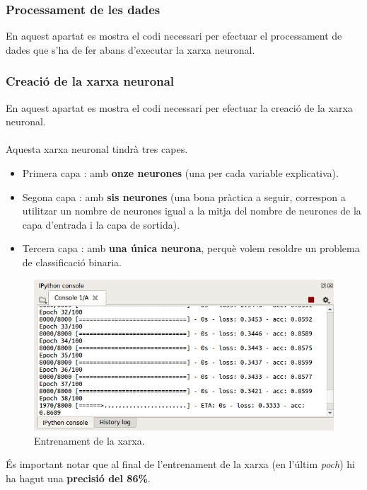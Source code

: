 \documentclass[12pt]{article}
\begin{document}
\subsubsection{Processament de les dades}
En aquest apartat es mostra el codi necessari per efectuar el processament de dades que s'ha de fer abans d'executar la xarxa neuronal.


\subsubsection{Creació de la xarxa neuronal}
En aquest apartat es mostra el codi necessari per efectuar la creació de la xarxa neuronal.
\\\\Aquesta xarxa neuronal tindrà tres capes.
\begin{itemize}
	\item Primera capa : amb \textbf{onze neurones} (una per cada variable explicativa).
	\item Segona capa : amb \textbf{sis neurones} (una bona pràctica a seguir, correspon a utilitzar un nombre de neurones igual a la mitja del nombre de neurones de la capa d'entrada i la capa de sortida).
	\item Tercera capa : amb \textbf{una única neurona}, perquè volem resoldre un problema de classificació binaria.
\end{itemize}

\begin{figure}[h!]
	\centering
	\includegraphics[scale=0.4]{imatges/python/entrenament.png}
	\caption{Entrenament de la xarxa.}
\end{figure}
És important notar que al final de l'entrenament de la xarxa (en l'últim \textit{poch}) hi ha hagut una \textbf{precisió del 86\%}.
\end{document}
